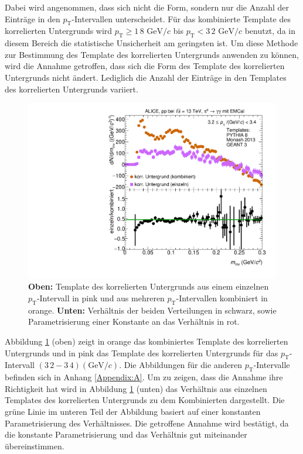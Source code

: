 Dabei wird angenommen, dass sich nicht die Form, sondern nur die Anzahl der Einträge in den $p_\text{T}$-Intervallen unterscheidet.  
Für das kombinierte Template des korrelierten Untergrunds wird $p_\text{T} \geq 1\,8\text{ GeV}/c$ bis $p_\text{T} < 3\,2\text{ GeV}/c$ benutzt, da in diesem Bereich die statistische Unsicherheit am geringsten ist.
Um diese Methode zur Bestimmung des Template des korrelierten Untergrunds anwenden zu können, wird die Annahme getroffen, dass sich die Form des Template des korrelierten Untergrunds nicht ändert.
Lediglich die Anzahl der Einträge in den Templates des korrelierten Untergrunds variiert.
\begin{figure}[t!]
\centering
\includegraphics[width=.7\linewidth]{BackgroundWithRatio10_Data_2016.pdf}
\caption{\textbf{Oben:} Template des korrelierten Untergrunds aus einem einzelnen $p_\text{T}$-Intervall in pink und aus mehreren $p_\text{T}$-Intervallen kombiniert in orange.
\textbf{Unten:} Verhältnis der beiden Verteilungen in schwarz, sowie Parametrisierung einer Konstante an das Verhältnis in rot.}
\label{fig:BkgTempRatio}
\end{figure}
\newline
Abbildung \ref{fig:BkgTempRatio} (oben) zeigt in orange das kombiniertes Template des korrelierten Untergrunds und in pink das Template des korrelierten Untergrunds für das $p_\text{T}$-Intervall $(3\,2 - 3\,4) (\text{GeV/}c)$.
Die Abbildungen für die anderen $p_\text{T}$-Intervalle befinden sich in Anhang \ref{Appendix:A}.
Um zu zeigen, dass die Annahme ihre Richtigkeit hat wird in Abbildung \ref{fig:BkgTempRatio} (unten) das Verhältnis aus einzelnen Templates des korrelierten Untergrunds zu dem Kombinierten dargestellt.
Die grüne Linie im unteren Teil der Abbildung basiert auf einer konstanten Parametrisierung des Verhältnisses.
Die getroffene Annahme wird bestätigt, da die konstante Parametrisierung und das Verhältnis gut miteinander übereinstimmen.
